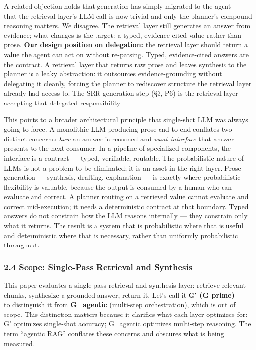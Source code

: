 A related objection holds that generation has simply migrated to the agent --- that the retrieval layer's LLM call is now trivial and only the planner's compound reasoning matters. We disagree. The retrieval layer still generates an answer from evidence; what changes is the target: a typed, evidence-cited value rather than prose. \textbf{Our design position on delegation:} the retrieval layer should return a value the agent can act on without re-parsing. Typed, evidence-cited answers are the contract. A retrieval layer that returns raw prose and leaves synthesis to the planner is a leaky abstraction: it outsources evidence-grounding without delegating it cleanly, forcing the planner to rediscover structure the retrieval layer already had access to. The SRR generation step (§3, P6) is the retrieval layer accepting that delegated responsibility.

This points to a broader architectural principle that single-shot LLM was always going to force. A monolithic LLM producing prose end-to-end conflates two distinct concerns: \emph{how} an answer is reasoned and \emph{what interface} that answer presents to the next consumer. In a pipeline of specialized components, the interface is a contract --- typed, verifiable, routable. The probabilistic nature of LLMs is not a problem to be eliminated; it is an asset in the right layer. Prose generation --- synthesis, drafting, explanation --- is exactly where probabilistic flexibility is valuable, because the output is consumed by a human who can evaluate and correct. A planner routing on a retrieved value cannot evaluate and correct mid-execution; it needs a deterministic contract at that boundary. Typed answers do not constrain how the LLM reasons internally --- they constrain only what it returns. The result is a system that is probabilistic where that is useful and deterministic where that is necessary, rather than uniformly probabilistic throughout.

\subsubsection{2.4 Scope: Single-Pass Retrieval and Synthesis}\label{scope-single-pass-retrieval-and-synthesis}

This paper evaluates a single-pass retrieval-and-synthesis layer: retrieve relevant chunks, synthesize a grounded answer, return it. Let's call it \textbf{G' (G prime)} --- to distinguish it from \textbf{G\_agentic} (multi-step orchestration), which is out of scope. This distinction matters because it clarifies what each layer optimizes for: G' optimizes single-shot accuracy; G\_agentic optimizes multi-step reasoning. The term ``agentic RAG'' conflates these concerns and obscures what is being measured.

